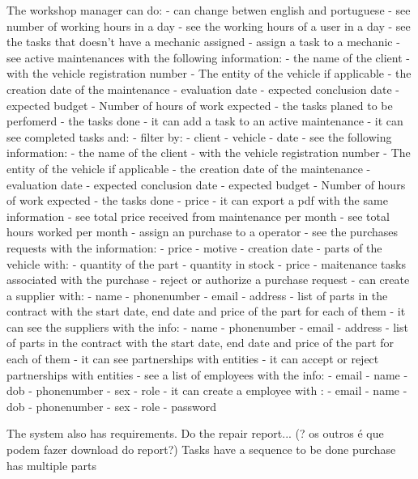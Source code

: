 The workshop manager can do:
- can change betwen english and portuguese
- see number of working hours in a day 
- see the working hours of a user in a day 
- see the tasks that doesn't have a mechanic assigned
- assign a task to a mechanic
- see active maintenances with the following information:
  - the name of the client
  - with the vehicle registration number
  - The entity of the vehicle if applicable
  - the creation date of the maintenance
  - evaluation date
  - expected conclusion date
  - expected budget
  - Number of hours of work expected
  - the tasks planed to be perfomerd
  - the tasks done
- it can add a task to an active maintenance
- it can see completed tasks and:
  - filter by:
    - client
    - vehicle
    - date
  - see the following information:
    - the name of the client
    - with the vehicle registration number
    - The entity of the vehicle if applicable
    - the creation date of the maintenance
    - evaluation date
    - expected conclusion date
    - expected budget
    - Number of hours of work expected
    - the tasks done
    - price
  - it can export a pdf with the same information
  - see total price received from maintenance per month
  - see total hours worked per month
- assign an purchase to a operator
- see the purchases requests with the information:
  - price
  - motive
  - creation date
  - parts of the vehicle with:
    - quantity of the part
    - quantity in stock
    - price
    - maitenance tasks associated with the purchase
- reject or authorize a purchase request
- can create a supplier with:
  - name
  - phonenumber
  - email
  - address
  - list of parts in the contract with the start date, end date and price of the part for each of them
- it can see the suppliers with the info:
  - name
  - phonenumber
  - email
  - address
  - list of parts in the contract with the start date, end date and price of the part for each of them
- it can see partnerships with entities
- it can accept or reject partnerships with entities
- see a list of employees with the info:
  - email
  - name
  - dob
  - phonenumber
  - sex
  - role
- it can create a employee with :
  - email
  - name
  - dob
  - phonenumber
  - sex
  - role
  - password










 


The system also has requirements.
Do the repair report... (? os outros é que podem fazer download do report?)
Tasks have a sequence to be done
purchase has multiple parts


